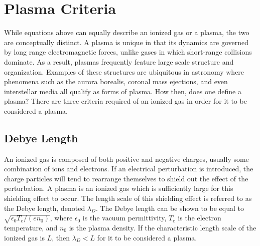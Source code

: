 \section{Plasma Criteria}
While equations above can equally describe an ionized gas or a plasma, the two
are conceptually distinct. A plasma is unique in that its dynamics are governed
by long range electromagnetic forces, unlike gases in which short-range
collisions dominate. As a result, plasmas frequently feature large scale
structure and organization. Examples of these structures are ubiquitous in
astronomy where phenomena such as the aurora borealis, coronal mass ejections,
and even interstellar media all qualify as forms of plasma. How then, does one
define a plasma? There are three criteria required of an ionized gas in order
for it to be considered a plasma.

\subsection{Debye Length}
An ionized gas is composed of both positive and negative charges, usually some
combination of ions and electrons. If an electrical perturbation is introduced,
the charge particles will tend to rearrange themselves to shield out the effect
of the perturbation. A plasma is an ionized gas which is sufficiently large for
this shielding effect to occur. The length scale of this shielding effect is
referred to as the Debye length, denoted $\lambda_D$. The Debye length can be
shown to be equal to $\sqrt{\epsilon_0T_e/(en_0)}$, where $\epsilon_0$ is the
vacuum permittivity, $T_e$ is the electron temperature, and $n_0$ is the plasma
density. If the characteristic length scale of the ionized gas is $L$, then
$\lambda_D < L$ for it to be considered a plasma.

